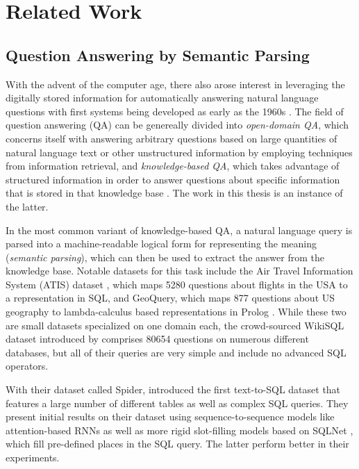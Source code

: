 \chapter{Related Work}
\label{ch:related-work}

\section{Question Answering by Semantic Parsing}

With the advent of the computer age, there also arose interest in leveraging the
digitally stored information for automatically answering natural language
questions with first systems being developed as early as the 1960s
\parencite[e.g.][]{green-1961}. The field of question answering (QA) can be
genereally divided into \emph{open-domain QA}, which concerns itself with
answering arbitrary questions based on large quantities of natural language text
or other unstructured information by employing techniques from information
retrieval, and \emph{knowledge-based QA}, which takes advantage of structured
information in order to answer questions about specific information that is
stored in that knowledge base \parencites[cf.][]{molla-2007}{jurafsky-2021}. The
work in this thesis is an instance of the latter.

In the most common variant of knowledge-based QA, a natural language query is
parsed into a machine-readable logical form for representing the meaning
(\emph{semantic parsing}), which can then be used to extract the answer from the
knowledge base. Notable datasets for this task include the Air Travel
Information System (ATIS) dataset \parencite{hemphill-1990}, which maps
\num{5280} questions about flights in the USA to a representation in SQL, and
GeoQuery, which maps \num{877} questions about US geography to lambda-calculus
based representations in Prolog \parencite{zelle-1996}. While these two are
small datasets specialized on one domain each, the crowd-sourced WikiSQL dataset
introduced by \textcite{zhong-2017} comprises \num{80654} questions on numerous
different databases, but all of their queries are very simple and include no
advanced SQL operators.

With their dataset called Spider, \textcite{yu-2018} introduced the first
text-to-SQL dataset that features a large number of different tables as well as
complex SQL queries. They present initial results on their dataset using
sequence-to-sequence models like attention-based RNNs as well as more rigid
slot-filling models based on SQLNet \parencite{xu-2017}, which fill pre-defined
places in the SQL query. The latter perform better in their experiments.

